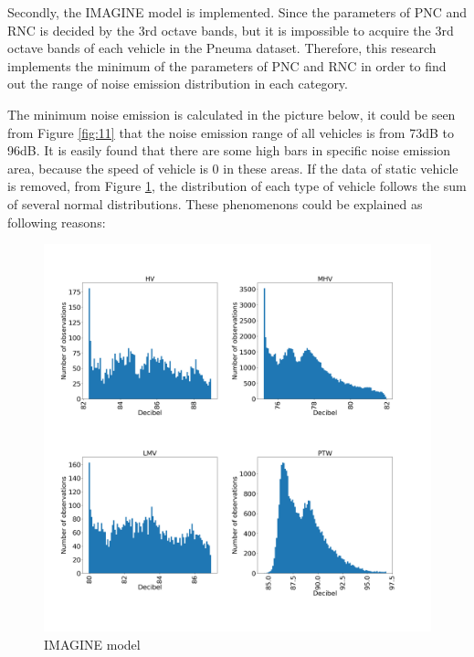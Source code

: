 \documentclass{article}
\begin{document}
\noindent Secondly, the IMAGINE model is implemented. Since the parameters of PNC and RNC is decided by the 3rd octave bands, but it is impossible to acquire the 3rd octave bands of each vehicle in the Pneuma dataset. Therefore, this research implements the minimum of the parameters of PNC and RNC in order to find out the range of noise emission distribution in each category.

\noindent The minimum noise emission is calculated in the picture below, it could be seen from Figure \ref{fig:11} that the noise emission range of all vehicles is from 73dB to 96dB. It is easily found  that there are some high bars in specific noise emission area, because the speed of vehicle is 0 in these areas. If the data of static vehicle is removed, from Figure \ref{IMAGINE model}, the distribution of each type of vehicle follows the sum of several normal distributions. These phenomenons could be explained as following reasons:

\begin{figure}[h]
    \begin{center}
        \includegraphics[width=14cm]{IMAGINE model.png}
        \caption{IMAGINE model}
        \label{IMAGINE model}
    \end{center}
\end{figure}
\end{document}
